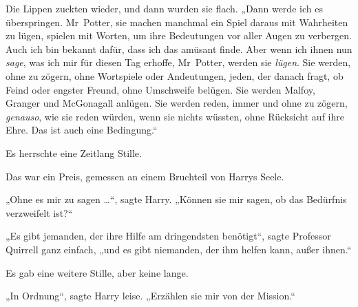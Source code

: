 Die Lippen zuckten wieder, und dann wurden sie flach.
„Dann werde ich es überspringen. Mr~Potter, sie machen manchmal ein Spiel daraus mit Wahrheiten zu lügen, spielen mit Worten, um ihre Bedeutungen vor aller Augen zu verbergen. Auch ich bin bekannt dafür, dass ich das amüsant finde. Aber wenn ich ihnen nun \emph{sage}, was ich mir für diesen Tag erhoffe, Mr~Potter, werden sie \emph{lügen}. Sie werden, ohne zu zögern, ohne Wortspiele oder Andeutungen, jeden, der danach fragt, ob Feind oder engster Freund, ohne Umschweife belügen. Sie werden Malfoy, Granger und McGonagall anlügen. Sie werden reden, immer und ohne zu zögern, \emph{genauso}, wie sie reden würden, wenn sie nichts wüssten, ohne Rücksicht auf ihre Ehre. Das ist auch eine Bedingung.“

Es herrschte eine Zeitlang Stille.

Das war ein Preis, gemessen an einem Bruchteil von Harrys Seele.

„Ohne es mir zu sagen …“, sagte Harry.
„Können sie mir sagen, ob das Bedürfnis verzweifelt ist?“

„Es gibt jemanden, der ihre Hilfe am dringendsten benötigt“, sagte Professor Quirrell ganz einfach, „und es gibt niemanden, der ihm helfen kann, außer ihnen.“

Es gab eine weitere Stille, aber keine lange.

„In Ordnung“, sagte Harry leise.
„Erzählen sie mir von der Mission.“


